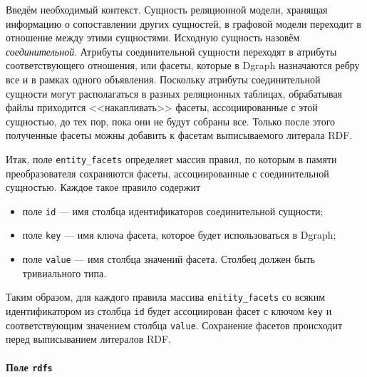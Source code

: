 Введём необходимый контекст. Сущность реляционной модели, хранящая информацию о сопоставлении других сущностей,
в графовой модели переходит в отношение между этими сущностями. Исходную сущность назовём \textit{соединительной}.
Атрибуты соединительной сущности переходят в атрибуты соответствующего отношения, или фасеты,
которые в Dgraph назначаются ребру все и в рамках одного объявления. Поскольку атрибуты соединительной сущности
могут располагаться в разных реляционных таблицах, обрабатывая файлы приходится <<накапливать>>
фасеты, ассоциированные с этой сущностью, до тех пор, пока они не будут собраны все. Только после
этого полученные фасеты можны добавить к фасетам выписываемого литерала RDF.

Итак, поле \texttt{entity\_facets} определяет массив правил, по которым в памяти преобразователя
сохраняются фасеты, ассоциированные с соединительной сущностью. Каждое такое правило содержит
\begin{itemize}
    \item поле \texttt{id} --- имя столбца идентификаторов соединительной сущности;
    \item поле \texttt{key} --- имя ключа фасета, которое будет использоваться в Dgraph;
    \item поле \texttt{value} --- имя столбца значений фасета. Столбец должен быть тривиального типа.
\end{itemize}

Таким образом, для каждого правила массива \texttt{enitity\_facets} со всяким идентификатором из
столбца \texttt{id} будет ассоциирован фасет с ключом \texttt{key} и соответствующим значением
столбца \texttt{value}. Сохранение фасетов происходит перед выписыванием литералов RDF.

\paragraph{Поле \texttt{rdfs}}

